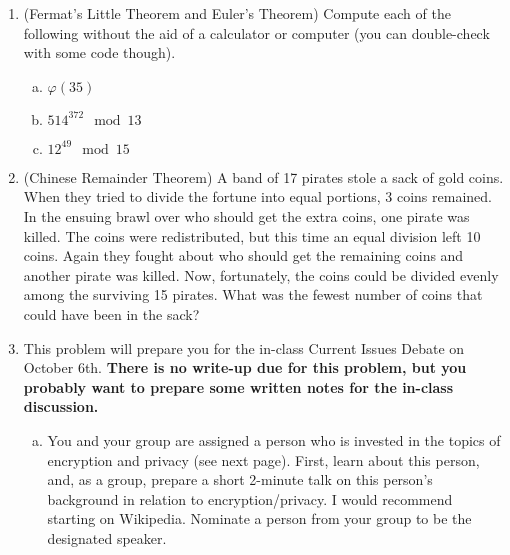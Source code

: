 \documentclass[12pt]{amsart}
\theoremstyle{plain}
\theoremstyle{definition}
\begin{document}
\begin{enumerate}[1.]
	\item (Fermat's Little Theorem and Euler's Theorem) Compute each of the following without the aid of a calculator or computer (you can double-check with some code though).
		\begin{enumerate}[a.]
			\item $\varphi(35)$
			\begin{framed}
			\vspace{.6in}
			\end{framed}
			\item $514^{372} \mod 13$
			\begin{framed}
			\vspace{1.3in}
			\end{framed}
			\item $12^{49} \mod 15$
			\begin{framed}
			\vspace{1.3in}
			\end{framed}
		\end{enumerate}
	\item (Chinese Remainder Theorem) A band of 17 pirates stole a sack of gold coins.  When they tried to divide the fortune into equal portions, 3 coins remained.  In the ensuing brawl over who should get the extra coins, one pirate was killed.  The coins were redistributed, but this time an equal division left 10 coins.  Again they fought about who should get the remaining coins and another pirate was killed.  Now, fortunately, the coins could be divided evenly among the surviving 15 pirates.  What was the fewest number of coins that could have been in the sack?
	\begin{framed}
	\vspace{7in}
	\end{framed}
	\item This problem will prepare you for the in-class Current Issues Debate on October 6th. \textbf{There is no write-up due for this problem, but you probably want to prepare some written notes for the in-class discussion.}\\
		\begin{enumerate}[a.]
			\item You and your group are assigned a person who is invested in the topics of encryption and privacy (see next page).  First, learn about this person, and, as a group, prepare a short 2-minute talk on this person's background in relation to encryption/privacy. I would recommend starting on Wikipedia.  Nominate a person from your group to be the designated speaker.\\

\end{enumerate}
\end{enumerate}
\end{document}

